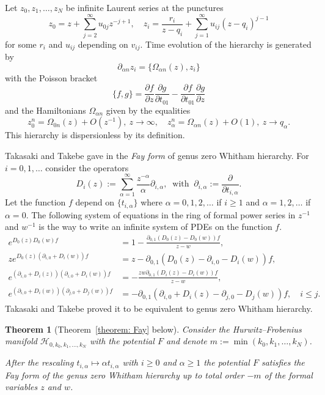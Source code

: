 \documentclass[12pt,a4paper]{amsart}
\def\H{{\mathcal H}}
\newcommand{\p}{{\partial}}
\newcommand{\<}{\left<}
\renewcommand{\>}{\right>}
\newtheorem*{theorem*}{Theorem}
\numberwithin{equation}{section}
\begin{document}
Let $z_0,z_1,\dots,z_N$ be infinite Laurent series at the punctures
\[
  z_0 = z + \sum_{j = 2}^\infty u_{0j} z^{-j+1} , \quad z_i = \frac{r_i}{z - q_i} + \sum_{j = 1}^\infty u_{i j} (z-q_i)^{j-1}
\]
for some $r_i$ and $u_{ij}$ depending on $v_{ij}$. Time evolution of the hierarchy is generated by
\[
    \p_{\alpha n} z_i = \lbrace \Omega_{\alpha n} (z), z_i \rbrace
\]
with the Poisson bracket
\[
 \lbrace f,g \rbrace = \frac{\p f}{\p z} \frac{\p g}{\p t_{01}} - \frac{\p f}{\p t_{01}} \frac{\p g}{\p z}
\]
and the Hamiltonians $\Omega_{\alpha n}$ given by the equalities
\[
    z_0^n = \Omega_{0n}(z) + O(z^{-1}), \ z \to \infty,
    \quad
    z_\alpha^n = \Omega_{\alpha n}(z) + O(1), \ z \to q_\alpha.
\]
This hierarchy is dispersionless by its definition.

Takasaki and Takebe gave in \cite{TT07} the \textit{Fay form} of genus zero Whitham hierarchy.
For $i =0,1,\dots$ consider the operators
\[
 D_i(z) := \sum_{\alpha = 1}^\infty \frac{z^{-\alpha}}{\alpha} \p_{i,\alpha}, \ \text{ with } \ \p_{i,\alpha} := \frac{\p}{\p t_{i,\alpha}}.
\]
Let the function $f$ depend on $\lbrace t_{i,\alpha} \rbrace$ where $\alpha = 0,1,2,\dots$  if $i \ge 1$ and $\alpha = 1,2,\dots$ if $\alpha = 0$.
The following system of equations in the ring of formal power series in $z^{-1}$ and $w^{-1}$ is the way to write an infinite system of PDEs on the function $f$.
\begin{align*}
    e^{D_0(z)D_0(w)f} &= 1 - \frac{\p_{0,1} (D_0(z) - D_0(w)) f}{z - w},
    \\
    z e^{D_0(z)(\p_{i,0} + D_i(w))f} &= z - \p_{0,1} (D_0(z) - \p_{i,0} - D_i(w)) f,
    \\
    e^{(\p_{i,0} +D_i(z))(\p_{i,0} +D_i(w))f} &= - \frac{zw \p_{0,1} (D_i(z) - D_i(w)) f}{z - w},
    \\
    e^{(\p_{i,0} + D_i(w))(\p_{j,0} + D_j(w))f} &= - \p_{0,1} (\p_{i,0}+ D_i(z) - \p_{j,0} - D_j(w)) f, \quad i \le j.
\end{align*}
Takasaki and Takebe proved it to be equivalent to genus zero Whitham hierarchy.

\begin{theorem*}[Theorem~\ref{theorem: Fay} below]
    Consider the Hurwitz--Frobenius manifold $\H_{0,k_0,k_1,\dots,k_N}$ with the potential $F$ and denote $m := \min(k_0,k_1,\dots,k_N)$.

    After the rescaling $t_{i,\alpha} \mapsto \alpha t_{i,\alpha}$ with $ i \ge 0$ and $\alpha \ge 1$ the potential $F$ satisfies the Fay form of the genus zero Whitham hierarchy up to total order $-m$ of the formal variables $z$ and $w$.
\end{theorem*}
\end{document}
